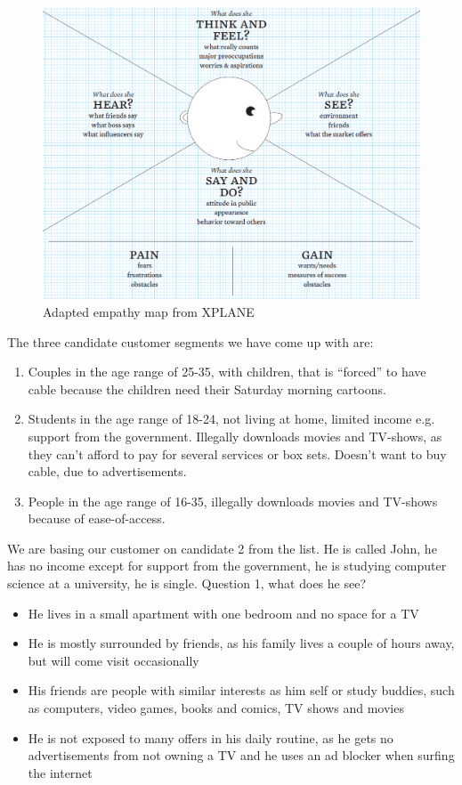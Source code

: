 \begin{figure}[h]
    \begin{center}
        \includegraphics[scale=0.52]{./pics/empathy_map}
        \caption{Adapted empathy map from XPLANE\cite[p. 130]{canvas}}
        \label{fig:empathy_map}
    \end{center}
\end{figure}

The three candidate customer segments we have come up with are:
\begin{enumerate}
\item Couples in the age range of 25-35, with children, that is ``forced'' to have cable because the children need their Saturday morning cartoons.
\item Students in the age range of 18-24, not living at home, limited income e.g. support from the government. Illegally downloads movies and TV-shows, as they can't afford to pay for several services or box sets. Doesn't want to buy cable, due to advertisements.
\item People in the age range of 16-35, illegally downloads movies and TV-shows because of ease-of-access.
\end{enumerate}

We are basing our customer on candidate 2 from the list. He is called John, he has no income except for support from the government, he is studying computer science at a university, he is single.
\newpage
Question 1, what does he see?
\begin{itemize}
\item He lives in a small apartment with one bedroom and no space for a TV
\item He is mostly surrounded by friends, as his family lives a couple of hours away, but will come visit occasionally 
\item His friends are people with similar interests as him self or study buddies, such as computers, video games, books and comics, TV shows and movies
\item He is not exposed to many offers in his daily routine, as he gets no advertisements from not owning a TV and he uses an ad blocker when surfing the internet
\end{itemize}

